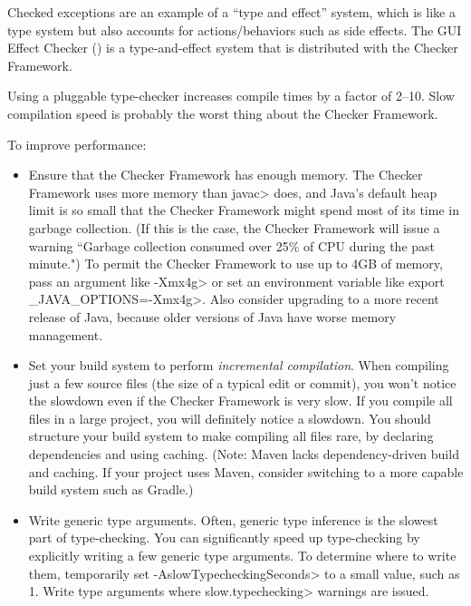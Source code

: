 Checked exceptions are an example of a ``type and effect'' system, which is
like a type system but also accounts for actions/behaviors such as side
effects.  The GUI Effect Checker () is a
type-and-effect system that is distributed with the Checker Framework.



Using a pluggable type-checker increases compile times by a factor of 2--10.
Slow compilation speed is probably the worst thing about the Checker
Framework.

To improve performance:
\begin{itemize}
\item
  Ensure that the Checker Framework has enough memory.  The Checker
  Framework uses more memory than \<javac> does, and Java's default heap
  limit is so small that the Checker Framework might spend most of its time
  in garbage collection.  (If this is the case, the Checker Framework will
  issue a warning ``Garbage collection consumed over 25\% of CPU during the
  past minute.")  To permit the Checker Framework to use up to 4GB of
  memory, pass an argument like \<-Xmx4g> or set an environment variable
  like \<export \_JAVA\_OPTIONS=-Xmx4g>.  Also consider upgrading to a more
  recent release of Java, because older versions of Java
  have worse memory management.
\item
  Set your build system to perform \emph{incremental compilation}.  When
  compiling just a few source files (the size of a typical edit or commit),
  you won't notice the slowdown even if the Checker Framework is very slow.
  If you compile all files in a large project, you will definitely notice a
  slowdown.  You should structure your build system to make compiling all
  files rare, by declaring dependencies and using caching.
  (Note: Maven lacks dependency-driven build and caching.  If your project
  uses Maven, consider switching to a more capable build system such as Gradle.)
\item
  Write generic type arguments.  Often, generic type inference is the
  slowest part of type-checking.  You can significantly speed up
  type-checking by explicitly writing a few generic type arguments.  To
  determine where to write them, temporarily set
  \<-AslowTypecheckingSeconds> to a small value, such as 1.  Write type
  arguments where \<slow.typechecking> warnings are issued.
\end{itemize}

